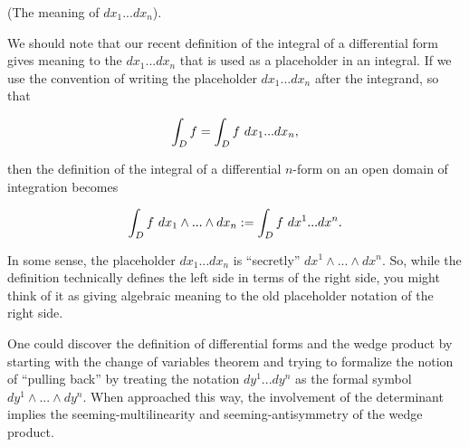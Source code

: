 \begin{remark}
    (The meaning of $dx_1 ... dx_n$).
    
    We should note that our recent definition of the integral of a differential form gives meaning to the $dx_1 ... dx_n$ that is used as a placeholder in an integral. If we use the convention of writing the placeholder $dx_1 ... dx_n$ after the integrand, so that
    
    \begin{align*}
        \int_D f = \int_D f \text{ } dx_1 ... dx_n,
    \end{align*}
    
    then the definition of the integral of a differential $n$-form on an open domain of integration becomes
    
    \begin{align*}
        \int_D f \text{ } dx_1 \wedge ... \wedge dx_n := \int_D f \text{ } dx^1 ... dx^n.
    \end{align*}

    In some sense, the placeholder $dx_1 ... dx_n$ is ``secretly'' $dx^1 \wedge ... \wedge dx^n$. So, while the definition technically defines the left side in terms of the right side, you might think of it as giving algebraic meaning to the old placeholder notation of the right side.
\end{remark}

\begin{remark}
    One could discover the definition of differential forms and the wedge product by starting with the change of variables theorem and trying to formalize the notion of ``pulling back'' by treating the notation $dy^1 ... dy^n$ as the formal symbol $dy^1 \wedge ... \wedge dy^n$. When approached this way, the involvement of the determinant implies the seeming-multilinearity and seeming-antisymmetry of the wedge product.
\end{remark}

